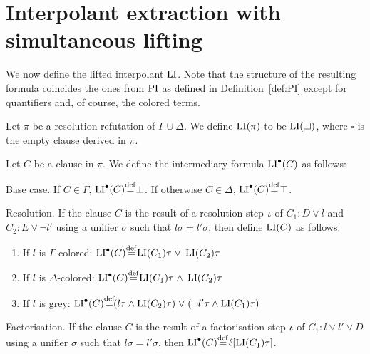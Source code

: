 \section{Interpolant extraction with simultaneous lifting}

We now define the lifted interpolant $\operatorname{LI}$.
Note that the structure of the resulting formula coincides the ones from $\operatorname{PI}$ as defined in Definition~\ref{def:PI} except for quantifiers and, of course, the colored terms.

\begin{defi}
	Let $\pi$ be a resolution refutation of $\Gamma \cup \Delta$.
	We define $\operatorname{LI}(\pi)$ to be $\operatorname{LI}(\square)$, where $\square$ is the empty clause derived in $\pi$.

	Let $C$ be a clause in $\pi$. 
	We define the intermediary formula $\operatorname{LI}^\bullet(C)$ as follows:
	\begin{description}
		\item{} Base case.
			If $C \in \Gamma$, $\LI^\bullet(C) \defeq \bot$.
			If otherwise $C \in \Delta$, $\LI^\bullet(C) \defeq \top$.

		\item{} Resolution.
			If the clause $C$ is the result of a resolution step $\iota$ of $C_1: D \lor l$ and $C_2: E \lor \lnot l'$ using a unifier $\sigma$ such that $l\sigma =  l'\sigma$, then define $\operatorname{LI}(C)$ as follows:
			\begin{enumerate}
				\item If $l$ is $\Gamma$-colored:
					$\LIpre(C) \defeq \LI(C_1)\tau\spas\lor \LI(C_2)\tau $

				\item If $l$ is $\Delta$-colored:
					$\LIpre(C) \defeq \LI(C_1)\tau\spas\land \LI(C_2)\tau$

				\item If $l$ is grey:
					$\LIpre(C) \defeq
					(l\tau \land \LI(C_2)\tau) \spas\lor
					(\lnot l'\tau\land \LI(C_1)\tau)
					$

			\end{enumerate}

		\item{} Factorisation.
			If the clause $C$ is the result of a factorisation step $\iota$ of $C_1: l \lor l' \lor D$ using a unifier $\sigma$ such that $l\sigma = l'\sigma$, then $\LIpre(C) \defeq \lifboth{\LI(C_1)\tau}$.


\end{description}
\end{defi}
